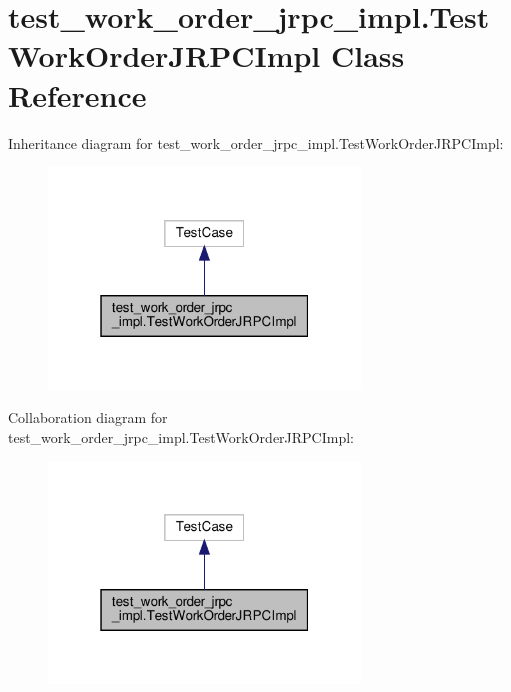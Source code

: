 \hypertarget{classtest__work__order__jrpc__impl_1_1TestWorkOrderJRPCImpl}{}\section{test\+\_\+work\+\_\+order\+\_\+jrpc\+\_\+impl.\+Test\+Work\+Order\+J\+R\+P\+C\+Impl Class Reference}
\label{classtest__work__order__jrpc__impl_1_1TestWorkOrderJRPCImpl}


Inheritance diagram for test\+\_\+work\+\_\+order\+\_\+jrpc\+\_\+impl.\+Test\+Work\+Order\+J\+R\+P\+C\+Impl\+:
\nopagebreak
\begin{figure}[H]
\begin{center}
\leavevmode
\includegraphics[width=235pt]{classtest__work__order__jrpc__impl_1_1TestWorkOrderJRPCImpl__inherit__graph}
\end{center}
\end{figure}


Collaboration diagram for test\+\_\+work\+\_\+order\+\_\+jrpc\+\_\+impl.\+Test\+Work\+Order\+J\+R\+P\+C\+Impl\+:
\nopagebreak
\begin{figure}[H]
\begin{center}
\leavevmode
\includegraphics[width=235pt]{classtest__work__order__jrpc__impl_1_1TestWorkOrderJRPCImpl__coll__graph}
\end{center}
\end{figure}
